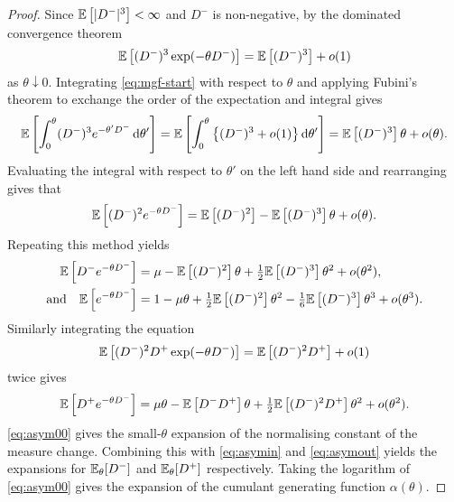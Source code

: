 \begin{proof}
    Since ${\mathbb E}\left[\lvert D^-\rvert^3\right] < \infty$ and $D^-$ is non-negative, by the dominated convergence theorem
    \begin{equation}
        {\mathbb E} \left[ (D^-)^3 \exp(-\theta D^-) \right] = {\mathbb E} \left[ (D^-)^3 \right] + o(1)
        \label{eq:mgf-start}
    \end{equation}
    as $\theta \downarrow 0$. Integrating \cref{eq:mgf-start} with respect to $\theta$ and applying Fubini's theorem to exchange the order of the expectation and integral gives
    \begin{equation*}
        {\mathbb E} \left[ \int_0^{\theta} (D^-)^3 e^{-\theta' D^-} \mathop{}\!\mathrm{d} \theta' \right]
        = {\mathbb E} \left[ \int_0^{\theta} \left\{ (D^-)^3 + o(1) \right\} \mathop{}\!\mathrm{d} \theta' \right]
        = {\mathbb E} \left[ (D^-)^3 \right] \theta + o(\theta).
    \end{equation*}
    Evaluating the integral with respect to $\theta'$ on the left hand side and rearranging gives that
    \begin{equation*}
        {\mathbb E} \left[ (D^-)^2 e^{-\theta D^-} \right]
        = {\mathbb E} \left[ (D^-)^2 \right] - {\mathbb E} \left[ (D^-)^3 \right] \theta + o(\theta).
    \end{equation*}
    Repeating this method yields
    \begin{align}
        {\mathbb E} \left[ D^- e^{-\theta D^-} \right]
        &= \mu - {\mathbb E} \left[ (D^-)^2 \right] \theta + \tfrac{1}{2} {\mathbb E} \left[ (D^-)^3 \right] \theta^2 + o(\theta^2), \label{eq:asymin} \\
        \text{and} \quad {\mathbb E} \left[ e^{-\theta D^-} \right]
        &= 1 - \mu \theta + \tfrac{1}{2} {\mathbb E} \left[ (D^-)^2 \right] \theta^2 - \tfrac{1}{6} {\mathbb E} \left[ (D^-)^3 \right] \theta^3 + o(\theta^3).
        \label{eq:asym00}
    \end{align}
    Similarly integrating the equation
    \begin{equation*}
        {\mathbb E} \left[ (D^-)^2 D^+ \exp(-\theta D^-) \right] = {\mathbb E} \left[ (D^-)^2 D^+ \right] + o(1)
    \end{equation*}
    twice gives
    \begin{equation}
        {\mathbb E} \left[ D^+ e^{-\theta D^-} \right]
        = \mu \theta - {\mathbb E} \left[ D^- D^+ \right] \theta + \tfrac{1}{2} {\mathbb E} \left[ (D^-)^2 D^+ \right] \theta^2 + o(\theta^2).
        \label{eq:asymout}
    \end{equation}
    \cref{eq:asym00} gives the small-$\theta$ expansion of the normalising constant of the measure change. Combining this with \cref{eq:asymin} and \cref{eq:asymout} yields the expansions for ${\mathbb E}_{\theta}[D^-]$ and ${\mathbb E}_{\theta}[D^+]$ respectively. Taking the logarithm of \cref{eq:asym00} gives the expansion of the cumulant generating function $\alpha(\theta)$.
\end{proof}

